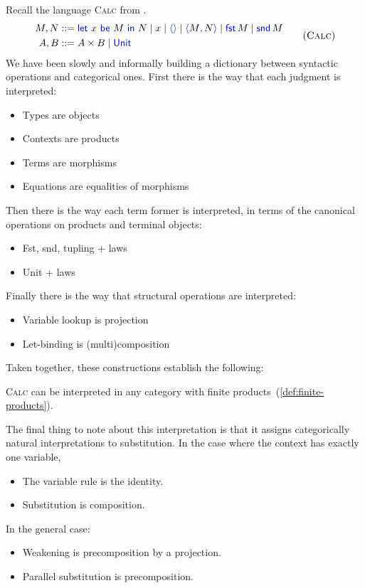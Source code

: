 Recall the language \textsc{Calc} from .
\begin{gather}
  \begin{aligned}
  M,N &::= \pllet{x}{M}{N} \mid x \mid \plunit{} \mid \plpair{M}{N} \mid \plfst{M} \mid \plsnd{M} \\
  A,B &::= A \times B \mid \plUnit
  \end{aligned}
  \tag{\textsc{Calc}}
  \label{lang:calc}
\end{gather}
We have been slowly and informally building a dictionary between
syntactic operations and categorical ones.
First there is the way that each judgment is interpreted:
\begin{itemize}
\item Types are objects
\item Contexts are products
\item Terms are morphisms
\item Equations are equalities of morphisms
\end{itemize}
Then there is the way each term former is interpreted,
in terms of the canonical operations on products and terminal objects:
\begin{itemize}
\item Fst, snd, tupling + laws
\item Unit + laws
\end{itemize}
Finally there is the way that structural operations are interpreted:
\begin{itemize}
\item Variable lookup is projection
\item Let-binding is (multi)composition
\end{itemize}
Taken together, these constructions establish the following:
\begin{theorem} \label{thm:calc-products}
  \textsc{Calc} can be interpreted in any category with finite products~(\cref{def:finite-products}).
\end{theorem}


The final thing to note about this interpretation is that it assigns categorically natural interpretations
to substitution. In the case where the context has exactly one variable,
\begin{itemize}
\item The variable rule is the identity.
\item Substitution is composition.
\end{itemize}
In the general case:
\begin{itemize}
\item Weakening is precomposition by a projection.
\item Parallel substitution is precomposition.
\end{itemize}

